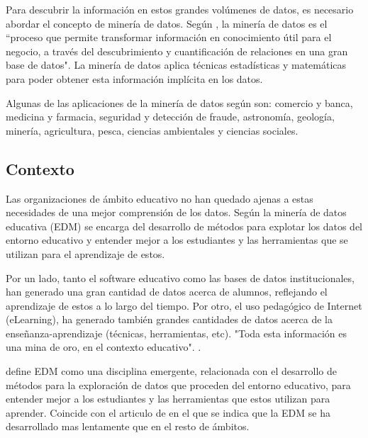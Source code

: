 Para descubrir la información en estos grandes volúmenes de datos, es necesario abordar el concepto de minería de datos.  Según , la minería de datos es el ``proceso que permite transformar información en conocimiento útil para el
negocio, a través del descubrimiento y cuantificación de relaciones en una
gran base de datos". La minería de datos aplica técnicas estadísticas y matemáticas para poder obtener esta información implícita en los datos.

Algunas de las aplicaciones de la minería de datos según \cite{riquelme2006mineria} son:  comercio y banca, medicina y farmacia, seguridad y detección de fraude, astronomía, geología, minería, agricultura, pesca, ciencias ambientales y ciencias sociales.


\subsection{Contexto}
Las organizaciones de ámbito educativo no han quedado ajenas a estas necesidades de una mejor comprensión de los datos. Según  la minería de datos educativa (EDM) se encarga del desarrollo de métodos para explotar los datos del entorno educativo y entender mejor a los estudiantes y las herramientas que se utilizan para el aprendizaje de estos.

Por un lado, tanto el software educativo como las bases de datos institucionales, han generado una gran cantidad de datos acerca de alumnos, reflejando el aprendizaje de estos a lo largo del tiempo. Por otro, el uso pedagógico de Internet (eLearning), ha generado también grandes cantidades de datos acerca de la enseñanza-aprendizaje (técnicas, herramientas, etc). "Toda esta información es una mina de oro, en el contexto educativo". \cite{romero2010educational}.

 define EDM como una disciplina emergente, relacionada con el desarrollo de métodos para la exploración  de datos que proceden del entorno educativo, para entender mejor a los estudiantes y las herramientas que estos utilizan para aprender. Coincide con el articulo de \cite{inbook} en el que se indica que la EDM se ha desarrollado mas lentamente que en el resto de ámbitos.


